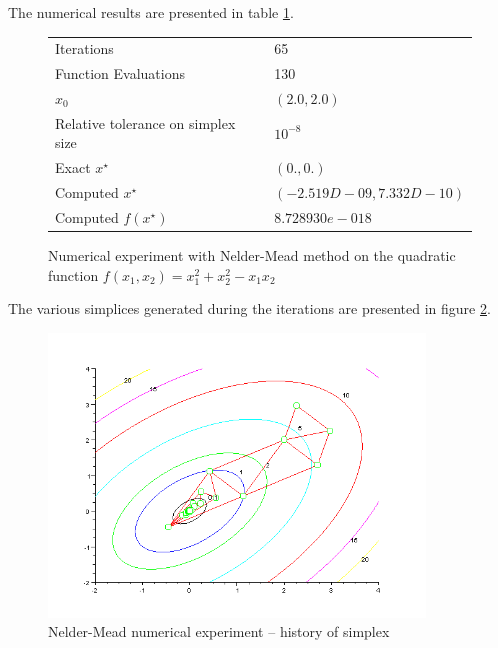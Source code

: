 The numerical results are presented in table \ref{fig-nm-numexp1-table}.

\begin{figure}[htbp]
\begin{center}
\begin{tabular}{|l|l|}
\hline
Iterations & 65 \\
Function Evaluations & 130 \\
$x_0$ & $(2.0,2.0)$ \\
Relative tolerance on simplex size & $10^{-8}$ \\
Exact $x^\star$ & $(0.,0.)$\\
Computed $x^\star$ & $(-2.519D-09 , 7.332D-10)$\\
Computed $f(x^\star)$ & $8.728930e-018$\\
\hline
\end{tabular}
\end{center}
\caption{Numerical experiment with Nelder-Mead method on the quadratic function
$f(x_1,x_2) = x_1^2 + x_2^2 - x_1 x_2$}
\label{fig-nm-numexp1-table}
\end{figure}

The various simplices generated during the iterations are 
presented in figure \ref{fig-nm-numexp1-historysimplex}.

\begin{figure}
\begin{center}
\includegraphics[width=10cm]{neldermeadmethod/quad2bis-nm-simplexcontours.png}
\end{center}
\caption{Nelder-Mead numerical experiment -- history of simplex}
\label{fig-nm-numexp1-historysimplex}
\end{figure}

